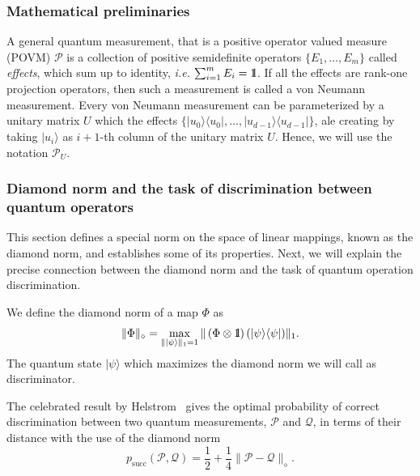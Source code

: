\documentclass[preprint,12pt, a4paper]{elsarticle}
\newcommand{\ie}{{\emph{i.e.\/}}}
\newcommand{\ket}[1]{\ensuremath{|#1\rangle}}
\newcommand{\bra}[1]{\ensuremath{\langle#1|}}
\newcommand{\ketbra}[2]{\ensuremath{\ket{#1}\bra{#2}}}
\newcommand{\proj}[1]{\ensuremath{\ketbra{#1}{#1}}}
\newcommand{\1}{{\rm 1\hspace{-0.9mm}l}}
\newcommand{\PP}{\mathcal{P}}
\begin{document}
\subsubsection{Mathematical preliminaries}



A general quantum
measurement, that is a positive operator valued measure (POVM) $\PP$ is a
collection of positive semidefinite operators $\{E_1, \ldots, E_m \}$ called
\emph{effects}, which sum up to identity, \ie $ \, \, \sum_{i=1}^m E_i = \1$. If
all the effects are rank-one projection operators, then such a measurement is
called a von Neumann measurement. Every von Neumann measurement can be
parameterized by a unitary matrix $U$ which the effects $\{\proj{u_0}, \ldots, \proj{u_{d-1}}\}$,
ale creating by taking $\ket{u_i}$ as  $i+1$-th column of the unitary matrix $U$.
Hence, we will use the notation $\PP_{U}$.
%
%

\subsubsection{Diamond norm and the task of discrimination between quantum operators}
This section defines a special norm on the space of linear mappings, known as
the diamond norm, and establishes some of its properties.
Next, we will explain the precise connection between the diamond
norm and the task of quantum operation discrimination.


We define the diamond norm of a map $\Phi$ as
\begin{equation}
\|\Phi\|_\diamond = \max_{\| \ket{\psi}\|_1=1} \| \left(\Phi \otimes \1\right) (\proj{\psi}) \|_1.
\end{equation}
The quantum state $\ket{\psi}$ which maximizes the diamond norm we will call as discriminator.

The celebrated result by Helstrom~\cite{helstrom1976quantum} gives the optimal  probability of correct discrimination between two quantum measurements, $\PP$  and $\mathcal{Q}$,
in terms of their distance with the use of the diamond norm
\begin{equation}
p_{\text{succ}}(\PP, \mathcal{Q}) =  \frac12 + \frac14 \| \PP - \mathcal{Q} \|_\diamond.
\end{equation}
\end{document}
